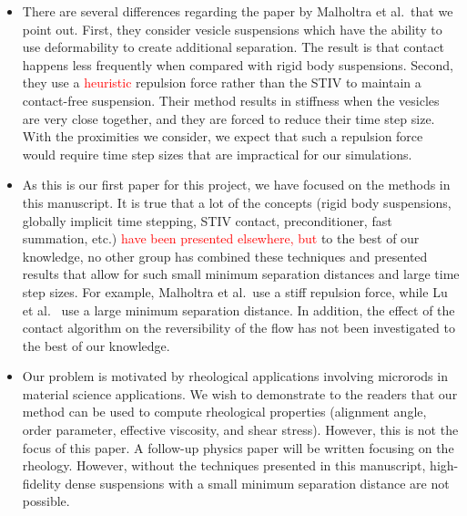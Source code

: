 \documentclass[11pt]{article}
\begin{document}
\begin{itemize}
  \item There are several differences regarding the paper by Malholtra
    et al.~that we point out.  First, they consider
    vesicle suspensions which have the ability to use deformability to
    create additional separation.  The result is that contact happens
    less frequently when compared with rigid body suspensions.  Second,
    they use a \textcolor{red}{heuristic} repulsion force rather than the STIV to maintain a
    contact-free suspension.  Their method results in stiffness when the
    vesicles are very close together, and they are forced to reduce
    their time step size.  With the proximities we consider, we expect
    that such a repulsion force would require time step sizes that are
    impractical for our simulations.

  \item As this is our first paper for this project, we have focused on
    the methods in this manuscript. It is true that a lot of the
    concepts (rigid body suspensions, globally implicit time stepping,
    STIV contact, preconditioner, fast summation, etc.) \textcolor{red}{have been presented elsewhere, but} to the best of
    our knowledge, no other group has combined these techniques and
    presented results that allow for such small minimum separation
    distances and large time step sizes.  For example, Malholtra et
    al.~use a stiff repulsion force, while Lu et al.~ use a large
    minimum separation distance.  In addition, the effect of the contact
    algorithm on the reversibility of the flow has not been investigated
    to the best of our knowledge.

  \item Our problem is motivated by rheological applications involving
    microrods in material science applications.  We wish to demonstrate
    to the readers that our method can be used to compute rheological
    properties (alignment angle, order parameter, effective viscosity,
    and shear stress).  However, this is not the focus of this paper.  A
    follow-up physics paper will be written focusing on the rheology.
    However, without the techniques presented in this manuscript,
    high-fidelity dense suspensions with a small minimum separation
    distance are not possible.
    
\end{itemize}
\end{document}
